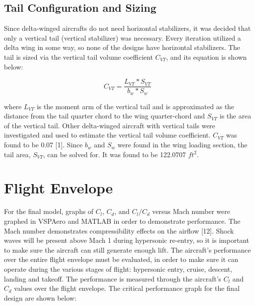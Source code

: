 \documentclass{article}
\begin{document}
\subsection{Tail Configuration and Sizing}
Since delta-winged aircrafts do not need horizontal stabilizers, it was decided that only a vertical tail (vertical stabilizer) was necessary. Every iteration utilized a delta wing in some way, so none of the designs have horizontal stabilizers. The tail is sized via the vertical tail volume coefficient ${C_{VT}}$, and its equation is shown below:

\begin{equation}
C_{VT} = \frac{L_{VT}*S_{VT}}{b_{w}*S_{w}}
\end {equation} 

where ${L_{VT}}$ is the moment arm of the vertical tail and is approximated as the distance from the tail quarter chord to the wing quarter-chord and ${S_{VT}}$ is the area of the vertical tail. Other delta-winged aircraft with vertical tails were investigated and used to estimate the vertical tail volume coefficient. ${C_{VT}}$ was found to be 0.07 [1]. Since ${b_{w}}$ and ${S_{w}}$ were found in the wing loading section, the tail area, ${S_{VT}}$, can be solved for. It was found to be 122.0707 ${ft^{2}}$.


\section{Flight Envelope}

For the final model, graphs of ${C_{l}}$, ${C_{d}}$, and ${C_{l}}/{C_{d}}$ versus Mach number were graphed in VSPAero and MATLAB in order to demonstrate performance. The Mach number demonstrates compressibility effects on the airflow [12]. Shock waves will be present above Mach 1 during hypersonic re-entry, so it is important to make sure the aircraft can still generate enough lift. The aircraft's performance over the entire flight envelope must be evaluated, in order to make sure it can operate during the various stages of flight: hypersonic entry, cruise, descent, landing and takeoff. The performance is measured through the aircraft's ${C_{l}}$ and ${C_{d}}$ values over the flight envelope. The critical performance graph for the final design are shown below: 
\end{document}
